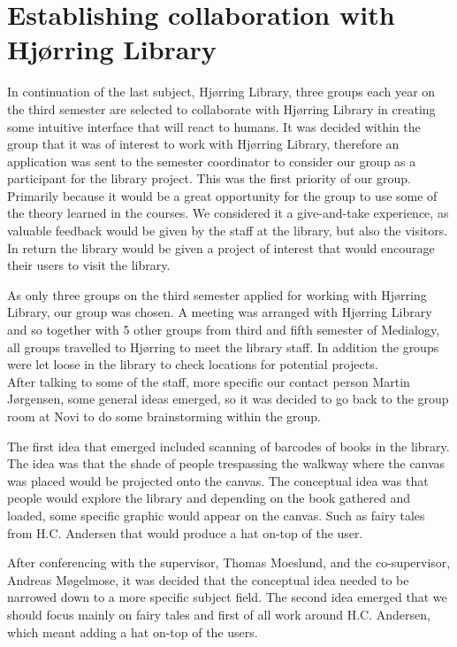 \section{Establishing collaboration with Hjørring Library}
In continuation of the last subject, Hjørring Library, three groups each year on the third semester are selected to collaborate with Hjørring Library in creating some intuitive interface that will react to humans. It was decided within the group that it was of interest to work with Hjørring Library, therefore an application was sent to the semester coordinator to consider our group as a participant for the library project. This was the first priority of our group. Primarily because it would be a great opportunity for the group to use some of the theory learned in the courses. We considered it a give-and-take experience, as valuable feedback would be given by the staff at the library, but also the visitors. In return the library would be given a project of interest that would encourage their users to visit the library.

As only three groups on the third semester applied for working with Hjørring Library, our group was chosen. A meeting was arranged with Hjørring Library and so together with 5 other groups from third and fifth semester of Medialogy, all groups travelled to Hjørring to meet the library staff. In addition the groups were let loose in the library to check locations for potential projects.\\
After talking to some of the staff, more specific our contact person Martin Jørgensen, some general ideas emerged, so it was decided to go back to the group room at Novi to do some brainstorming within the group.

The first idea that emerged included scanning of barcodes of books in the library. The idea was that the shade of people trespassing the walkway where the canvas was placed would be projected onto the canvas. The conceptual idea was that people would explore the library and depending on the book gathered and loaded, some specific graphic would appear on the canvas. Such as fairy tales from H.C. Andersen that would produce a hat on-top of the user.

After conferencing with the supervisor, Thomas Moeslund, and the co-supervisor, Andreas Møgelmose, it was decided that the conceptual idea needed to be narrowed down to a more specific subject field. The second idea emerged that we should focus mainly on fairy tales and first of all work around H.C. Andersen, which meant adding a hat on-top of the users.

